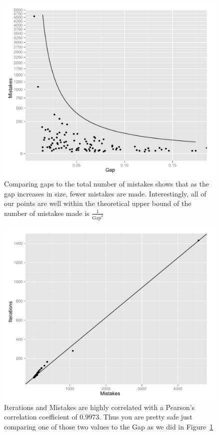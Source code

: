 \documentclass[12pt]{article}
\begin{document}
\begin{enumerate}
\begin{enumerate}
\begin{figure}[p]
\begin{center}
\includegraphics[scale=0.7]{ex1_gap_vs_Mistakes.pdf}
\caption{Comparing gaps to the total number of mistakes shows that as the gap increases in size, fewer mistakes are made. Interestingly, all of our points are well within the theoretical upper bound of the number of mistakes made is $\frac{1}{\text{Gap}^2}$}
\label{fig:gvm}
\end{center}

\end{figure}
\begin{figure}[p]
\begin{center}
\includegraphics[scale=0.7]{ex1_iteration_mistakes.pdf}
\caption{Iterations and Mistakes are highly correlated with a Pearson's correlation coefficient of $0.9973$. Thus you are pretty safe just comparing one of those two values to the Gap as we did in Figure~\ref{fig:gvm}}
\label{fig:mvi}
\end{center}
\end{figure}

\end{enumerate}
\end{enumerate}
\end{document}
